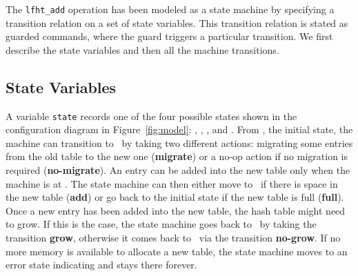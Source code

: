 The \texttt{lfht\_add} operation has been modeled as a state machine
by specifying a transition relation on a set of state variables. This
transition relation is stated as guarded commands, where the guard
triggers a particular transition.  We first describe the state
variables and then all the machine transitions.

\subsection{State Variables}

A variable \texttt{state} records one of the four possible states
shown in the configuration diagram in Figure~\ref{fig:model}:
\emph{\pczero}, \emph{\pcone}, \emph{\pctwo}, and \emph{\pcthree}.
%
From \pczero, the initial state, the machine can transition to
\pcone\ by taking two different actions: migrating some entries from
the old table to the new one (\textbf{migrate}) or a no-op action if
no migration is required (\textbf{no-migrate}). An entry can be added
into the new table only when the machine is at \pcone. The state
machine can then either move to \pctwo\ if there is space in the new
table (\textbf{add}) or go back to the initial state if the new table
is full (\textbf{full}). Once a new entry has been added into the new
table, the hash table might need to grow. If this is the case, the
state machine goes back to \pczero\ by taking the transition
\textbf{grow}, otherwise it comes back to \pczero\ via the transition
\textbf{no-grow}. If no more memory is available to allocate a new
table, the state machine moves to an error state indicating and 
stays there forever.


